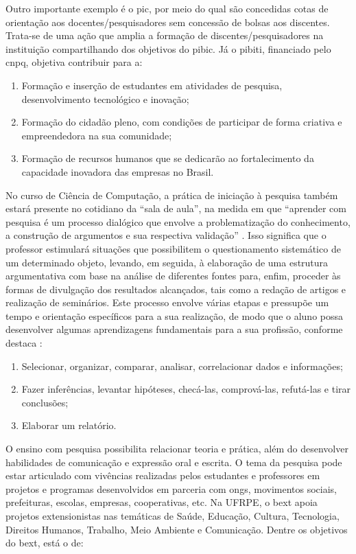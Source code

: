 \documentclass[
	12pt,				%
	openright,			%
  oneside,     %
	a4paper,			%
 hyphens,
	chapter=TITLE,		%
	english,			%
	french,				%
	spanish,			%
	brazil				%
	]{abntex2}
\begin{document}
Outro importante exemplo é o \acrfull{pic}, por meio do qual são concedidas cotas de orientação aos docentes/pesquisadores sem concessão de bolsas aos discentes. Trata-se de uma ação que amplia a formação de discentes/pesquisadores na instituição compartilhando dos objetivos do \acrshort{pibic}. Já o \acrfull{pibiti}, financiado pelo \acrshort{cnpq}, objetiva contribuir para a:

\begin{enumerate}[label=(\alph*)]
    \item Formação e inserção de estudantes em atividades de pesquisa,  desenvolvimento tecnológico e inovação;
    \item Formação do cidadão pleno, com condições de participar de forma criativa e empreendedora na sua comunidade;
    \item Formação de recursos humanos que se dedicarão ao fortalecimento da capacidade inovadora das 	empresas no Brasil.
\end{enumerate}

No curso de Ciência de Computação, a prática de iniciação à pesquisa também estará presente no cotidiano da “sala de aula”, na medida em que “aprender com pesquisa é um processo dialógico que envolve a problematização do conhecimento, a construção de argumentos e sua respectiva validação” \cite{lampert2008ensino}. Isso significa que o professor estimulará situações que possibilitem o questionamento sistemático de um determinado objeto, levando, em seguida, à elaboração de uma estrutura argumentativa com base na análise de diferentes fontes para, enfim, proceder às formas de divulgação dos resultados alcançados, tais como a redação de artigos e realização de seminários. Este processo envolve várias etapas e pressupõe um tempo e orientação específicos para a sua realização, de modo que o aluno possa desenvolver algumas aprendizagens fundamentais para a sua profissão, conforme destaca :

\begin{enumerate}[label=(\alph*)]
    \item Selecionar, organizar, comparar, analisar, correlacionar dados e informações;
    \item Fazer inferências, levantar hipóteses, checá-las, comprová-las, refutá-las e tirar conclusões;
    \item Elaborar um relatório.
\end{enumerate}

O ensino com pesquisa possibilita relacionar teoria e prática, além do desenvolver habilidades de comunicação e expressão oral e escrita. O tema da pesquisa pode estar articulado com vivências realizadas pelos estudantes e professores em projetos e programas desenvolvidos em parceria com \acrshort{ongs}, movimentos sociais, prefeituras, escolas, empresas, cooperativas, etc. Na UFRPE, o \acrfull{bext} apoia projetos extensionistas nas temáticas de Saúde, Educação, Cultura, Tecnologia, Direitos Humanos, Trabalho, Meio Ambiente e Comunicação. Dentre os objetivos do \acrshort{bext}, está o de:
\end{document}
